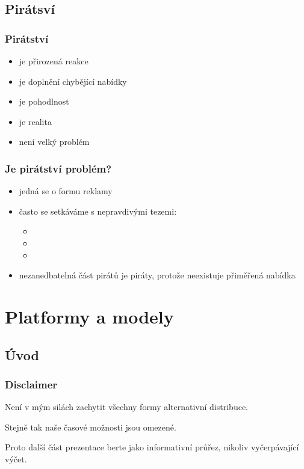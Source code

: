 \documentclass[xetex]{beamer}
\begin{document}
\subsection{Pirátsví}
\begin{frame}
 \frametitle{Pirátství}
 \begin{itemize}
  \item je přirozená reakce
  \item je doplnění chybějící nabídky
  \item je pohodlnost
  \item je realita
  \item není velký problém
 \end{itemize}
\end{frame}

\begin{frame}
 \frametitle{Je pirátství problém?}
 \begin{itemize}
  \item jedná se o formu reklamy 
  \item často se setkáváme s nepravdivými tezemi: 
	\begin{itemize}
	\item {}
 	\item {}
    \item {}
	\end{itemize}
  \item nezanedbatelná část pirátů je piráty, protože neexistuje přiměřená nabídka
 \end{itemize}
\end{frame}

\section{Platformy a modely}
\subsection{Úvod}

\begin{frame}
\frametitle{Disclaimer}
Není v mým silách zachytit všechny formy alternativní distribuce.

Stejně tak naše časové možnosti jsou omezené.

Proto další část prezentace berte jako informativní průřez, nikoliv vyčerpávající výčet.
\end{frame}
\end{document}

